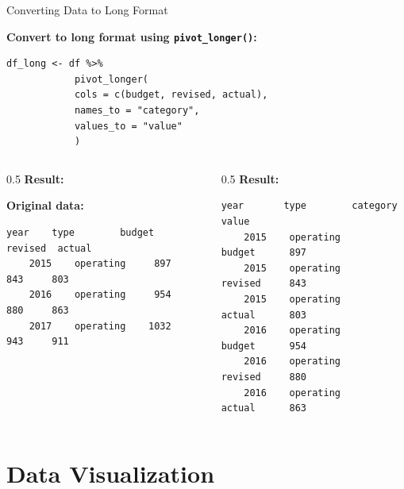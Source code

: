 \documentclass[aspectratio=169,11pt]{beamer}
\begin{document}
	\begin{frame}[fragile]{Converting Data to Long Format}
		
	
		
		\vspace{0.2cm}
		
		\textbf{Convert to long format using \texttt{pivot\_longer()}:}
		
		\begin{lstlisting}[basicstyle=\small\ttfamily]
			df_long <- df %>%
			pivot_longer(
			cols = c(budget, revised, actual),
			names_to = "category",
			values_to = "value"
			)
		\end{lstlisting}
		
		\vspace{0.2cm}
		
		\begin{columns}
			\begin{column}{0.5\textwidth}
				\textbf{Result:}
				
				\textbf{Original data:}
			
			\begin{lstlisting}[basicstyle=\scriptsize\ttfamily]
	year    type        budget  revised  actual
	2015    operating     897      843     803
	2016    operating     954      880     863
	2017    operating    1032      943     911
			\end{lstlisting}
			\end{column}
			
			\begin{column}{0.5\textwidth}
				\textbf{Result:}
				
				\begin{lstlisting}[basicstyle=\scriptsize\ttfamily]
	year       type        category   value
	2015    operating       budget      897
	2015    operating       revised     843
	2015    operating       actual      803
	2016    operating       budget      954
	2016    operating       revised     880
	2016    operating       actual      863
				\end{lstlisting}
				
			\end{column}
		\end{columns}
		
		
	\end{frame}
	
	\section{Data Visualization}
	
\end{document}
